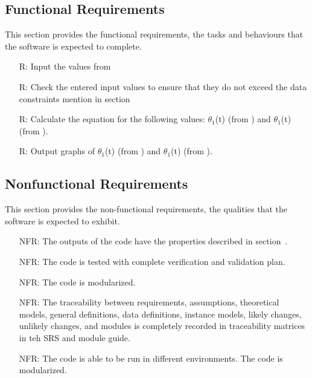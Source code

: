 \documentclass[12pt]{article}
\newcounter{reqnum} %
\begin{document}
\subsection{Functional Requirements}\label{sec_funReq}
This section provides the functional requirements, the tasks and behaviours that the software is expected to complete. \\
\noindent \begin{itemize}

\item[R\refstepcounter{reqnum}\thereqnum \label{R_Inputs}:] 
Input the values from 
\item[R\refstepcounter{reqnum}\thereqnum \label{R_VarifyInputs}:]  
Check the entered input values to ensure that they do not exceed the data constraints mention in section~
\item[R\refstepcounter{reqnum}\thereqnum \label{R_Calculate}:] Calculate the equation for the following values: $\theta_1$(t) (from ) and $\theta_1$(t) (from ).

\item[R\refstepcounter{reqnum}\thereqnum \label{R_Output}:] Output graphs of $\theta_1$(t) (from ) and $\theta_1$(t) (from ).

\end{itemize}

\subsection{Nonfunctional Requirements}\label{sec_nfr}
This section provides the non-functional requirements, the qualities that the software is expected to exhibit.


\noindent \begin{itemize}

\item[NFR\refstepcounter{reqnum}\thereqnum \label{NFR_Correct}:] 
The outputs of the code have the properties described in section~.
\item[NFR\refstepcounter{reqnum}\thereqnum \label{NFR_Verifiable}:]  
The code is tested with complete verification and validation plan.
\item[NFR\refstepcounter{reqnum}\thereqnum \label{R_Reusable}:]
The code is modularized. 
\item[NFR\refstepcounter{reqnum}\thereqnum \label{R_Maintainable}:]
The traceability between requirements, assumptions, theoretical models, general definitions, data definitions, instance models, likely changes, unlikely changes, and modules is completely recorded in traceability matrices in teh SRS and module guide. 
\item[NFR\refstepcounter{reqnum}\thereqnum \label{R_Portable}:]
The code is able to be run in different environments. 
The code is modularized.
\end{itemize}
\end{document}
